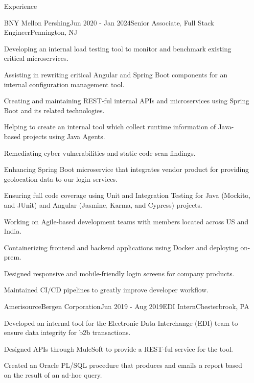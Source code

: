 \documentclass[
	11pt, %
]{resume} %
\begin{document}
\begin{rSection}{Experience}

	\begin{rSubsection}{BNY Mellon \textbar{} Pershing}{Jun 2020 - Jan 2024}{Senior Associate, Full Stack Engineer}{Pennington, NJ}
		\item Developing an internal load testing tool to monitor and benchmark existing critical microservices.
		\item Assisting in rewriting critical Angular and Spring Boot components for an internal configuration management tool.
		\item Creating and maintaining REST-ful internal APIs and microservices using Spring Boot and its related technologies.
		\item Helping to create an internal tool which collect runtime information of Java-based projects using Java Agents.
		\item Remediating cyber vulnerabilities and static code scan findings.
		\item Enhancing Spring Boot microservice that integrates vendor product for providing geolocation data to our login services.
		\item Ensuring full code coverage using Unit and Integration Testing for Java (Mockito, and JUnit) and Angular (Jasmine, Karma, and Cypress) projects.
		\item Working on Agile-based development teams with members located across US and India.
		\item Containerizing frontend and backend applications using Docker and deploying on-prem.
		\item Designed responsive and mobile-friendly login screens for company products.
		\item Maintained CI/CD pipelines to greatly improve developer workflow.
	\end{rSubsection}


	\begin{rSubsection}{AmerisourceBergen Corporation}{Jun 2019 - Aug 2019}{EDI Intern}{Chesterbrook, PA}
		\item Developed an internal tool for the Electronic Data Interchange (EDI) team to ensure data integrity for b2b transactions.
		\item Designed APIs through MuleSoft to provide a REST-ful service for the tool.
		\item Created an Oracle PL/SQL procedure that produces and emails a report based on the result of an ad-hoc query.
	\end{rSubsection}


\end{rSection}
\end{document}
